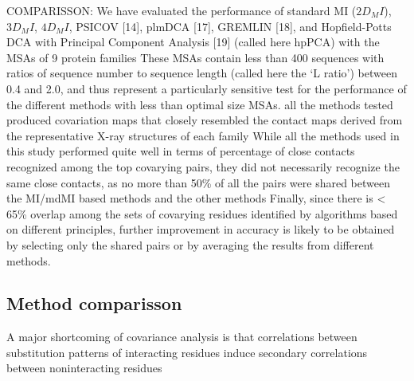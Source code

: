 COMPARISSON: \cite{clark2014multidimensional}
	We have evaluated the performance of standard MI ($2D_MI$), $3D_MI$, $4D_MI$, PSICOV [14], plmDCA [17], GREMLIN [18], and Hopfield-Potts DCA with Principal Component Analysis [19] (called here hpPCA) with the MSAs of 9 protein families \cite{clark2014multidimensional}
	These MSAs contain less than 400 sequences with ratios of sequence number to sequence length (called here the `L ratio') between 0.4 and 2.0, and thus represent a particularly sensitive test for the performance of the different methods with less than optimal size MSAs.  \cite{clark2014multidimensional}
	all the methods tested produced covariation maps that closely resembled the contact maps derived from the representative X-ray structures of each family \cite{clark2014multidimensional}
	While all the methods used in this study performed quite well in terms of percentage of close contacts recognized among the top covarying pairs, they did not necessarily recognize the same close contacts, as no more than 50\% of all the pairs were shared between the MI/mdMI based methods and the other methods \cite{clark2014multidimensional}
	Finally, since there is < 65\% overlap among the sets of covarying residues identified by algorithms based on different principles, further improvement in accuracy is likely to be obtained by selecting only the shared pairs or by averaging the results from different methods. \cite{clark2014multidimensional}

\subsection{Method comparisson}
A major shortcoming of covariance analysis is that correlations between substitution patterns of interacting residues induce secondary correlations between noninteracting residues \cite{morcos2011direct}



